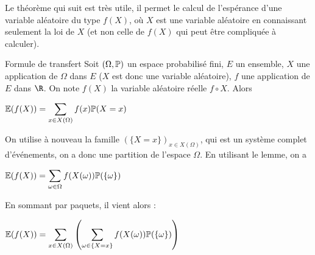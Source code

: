\documentclass[12pt,a4paper]{report}
\begin{document}
Le théorème qui suit est très utile, il permet le calcul de l'espérance d'une variable aléatoire du type $f(X)$, où $X$ est une variable aléatoire en connaissant seulement la loi de $X$ (et non celle de $f(X)$ qui peut être compliquée à calculer).

\begin{theoreme}{Formule de transfert}{}
Soit $(\Omega, \mathbb{P})$ un espace probabilisé fini, $E$ un ensemble, $X$ une application de $\Omega$ dans $E$ ($X$ est donc une variable aléatoire), $f$ une application de $E$ dans $\R$. On note $f(X)$ la variable aléatoire réelle $f\circ X$. Alors 
\begin{center}
$\mathbb{E}(f(X)) = \displaystyle \sum_{x \in X(\Omega)} f(x) \mathbb{P}(X=x)$
\end{center}
\end{theoreme}

\begin{demo}{}
On utilise à nouveau la famille $(\{X = x\})_{x \in X(\Omega)}$, qui est un système complet d'événements, on a donc une partition de l'espace $\Omega$. En utilisant le lemme, on a 
\begin{center}
$\mathbb{E}(f(X)) = \displaystyle \sum_{\omega \in \Omega} f(X(\omega)) \mathbb{P}(\{\omega\})$
\end{center}

En sommant par paquets, il vient alors :
\begin{center}
$\mathbb{E}(f(X)) = \displaystyle \sum_{x \in X(\Omega)} \left(\sum_{\omega \in \{X = x\}} f(X(\omega)) \mathbb{P}(\{\omega\})\right)$
\end{center}
\end{demo}
	
\end{document}
